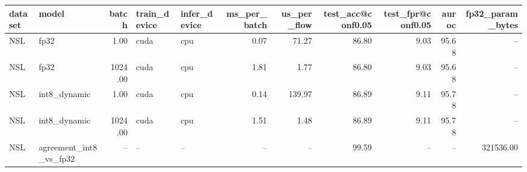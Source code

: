 \begin{tabular}{llrllrrrrrr}
\toprule
dataset & model & batch & train\_device & infer\_device & ms\_per\_batch & us\_per\_flow & test\_acc@conf0.05 & test\_fpr@conf0.05 & auroc & fp32\_param\_bytes \\
\midrule
NSL & fp32 & 1.00 & cuda & cpu & 0.07 & 71.27 & 86.80 & 9.03 & 95.68 & -- \\
NSL & fp32 & 1024.00 & cuda & cpu & 1.81 & 1.77 & 86.80 & 9.03 & 95.68 & -- \\
NSL & int8\_dynamic & 1.00 & cuda & cpu & 0.14 & 139.97 & 86.89 & 9.11 & 95.78 & -- \\
NSL & int8\_dynamic & 1024.00 & cuda & cpu & 1.51 & 1.48 & 86.89 & 9.11 & 95.78 & -- \\
NSL & agreement\_int8\_vs\_fp32 & -- & -- & -- & -- & -- & 99.59 & -- & -- & 321536.00 \\
\bottomrule
\end{tabular}
